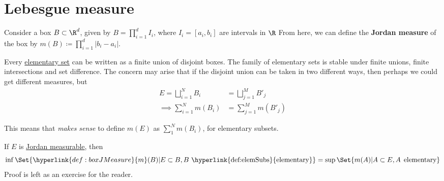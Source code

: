 \documentclass{article}
\newcommand{\1}[1]{\mathbbm{1}_{#1}}
\begin{document}
\clearpage
\section{Lebesgue measure}

\begin{defi}
    Consider a box $B \subset \R^d$, given by $B = \prod_{i=1}^d I_i$, where $I_i = [a_i, b_i]$ are intervals in $\R$
    From here, we can define the \textbf{Jordan measure} of the box by $m(B) \coloneqq \prod_{i=1}^d |b_i - a_i|$.
\end{defi}


\begin{remark}
    Every \hyperlink{def:elemSubs}{elementary set} can be written as a finite union of disjoint boxes.
    The family of elementary sets is stable under finite unions, finite intersections and set difference.
    The concern may arise that if the disjoint union can be taken in two different ways, then perhaps we could get different measures, but
    \begin{align*}
        E = \bigsqcup_{i=1}^N B_i &= \bigsqcup_{j=1}^M B'_j \\
        \implies \sum_{i=1}^N m(B_i) &= \sum_{j=1}^M m(B'_j)
    \end{align*}

    This means that \emph{makes sense} to define $m(E)$ as $\sum_1^N m(B_i)$, for elementary subsets.
\end{remark}


\begin{remark}
    If $E$ is \hyperlink{def:jMeasurable}{Jordan measurable}, then
    \begin{equation*}
        \inf\Set{\hyperlink{def:boxJMeasure}{m}(B)| E \subset B, B \text{ \hyperlink{def:elemSubs}{elementary}}} = \sup\Set{m(A)| A \subset E, A \;\, \text{elementary}}
    \end{equation*}
    Proof is left as an exercise for the reader.
\end{remark}
\end{document}
